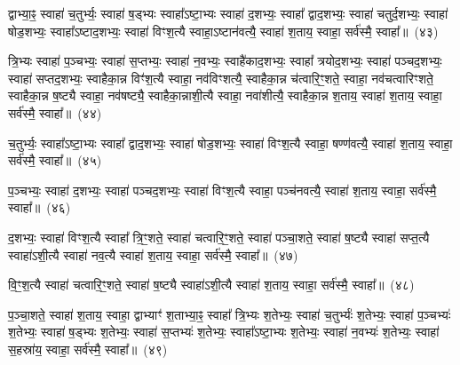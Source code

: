 {\anuvakamend[{एक॑स्मै त्रि॒भ्यः प॑ञ्चा॒शत्}]}%

द्वाभ्या॒ꣴ॒ स्वाहा॑ च॒तुर्भ्यः॒ स्वाहा॑ ष॒ड्भ्यः स्वाहा᳚\-ऽष्टा॒भ्यः स्वाहा॑ द॒शभ्यः॒ स्वाहा᳚ द्वाद॒शभ्यः॒ स्वाहा॑ चतुर्द॒शभ्यः॒ स्वाहा॑ षोड॒शभ्यः॒ स्वाहा᳚\-ऽष्टाद॒शभ्यः॒ स्वाहा॑ विꣳश॒त्यै स्वाहा॒\-ऽष्टान॑वत्यै॒ स्वाहा॑ श॒ताय॒ स्वाहा॒ सर्व॑स्मै॒ स्वाहा᳚॥~(४३)

{\anuvakamend[{द्वाभ्या॑म॒ष्टान॑वत्यै॒ षड्विꣳ॑शतिः}]}%

त्रि॒भ्यः स्वाहा॑ प॒ञ्चभ्यः॒ स्वाहा॑ स॒प्तभ्यः॒ स्वाहा॑ न॒वभ्यः॒ स्वाहै॑काद॒शभ्यः॒ स्वाहा᳚ त्रयोद॒शभ्यः॒ स्वाहा॑ पञ्चद॒शभ्यः॒ स्वाहा॑ सप्तद॒शभ्यः॒ स्वाहैका॒न्न विꣳ॑श॒त्यै स्वाहा॒ नव॑विꣳशत्यै॒ स्वाहैका॒न्न च॑त्वारि॒ꣳ॒शते॒ स्वाहा॒ नव॑चत्वारिꣳशते॒ स्वाहैका॒न्न ष॒ष्ट्यै स्वाहा॒ नव॑षष्ट्यै॒ स्वाहैका॒न्नाशी॒त्यै स्वाहा॒ नवा॑शीत्यै॒ स्वाहैका॒न्न श॒ताय॒ स्वाहा॑ श॒ताय॒ स्वाहा॒ सर्व॑स्मै॒ स्वाहा᳚॥~(४४)

{\anuvakamend[{त्रि॒भ्यो᳚\-ऽष्टाचत्वारि॒ꣳ॒शत्}]}%

च॒तुर्भ्यः॒ स्वाहा᳚\-ऽष्टा॒भ्यः स्वाहा᳚ द्वाद॒शभ्यः॒ स्वाहा॑ षोड॒शभ्यः॒ स्वाहा॑ विꣳश॒त्यै स्वाहा॒ षण्ण॑वत्यै॒ स्वाहा॑ श॒ताय॒ स्वाहा॒ सर्व॑स्मै॒ स्वाहा᳚॥~(४५)

{\anuvakamend[{च॒तुर्भ्यः॒ षण्ण॑वत्यै॒ षोड॑श}]}%

प॒ञ्चभ्यः॒ स्वाहा॑ द॒शभ्यः॒ स्वाहा॑ पञ्चद॒शभ्यः॒ स्वाहा॑ विꣳश॒त्यै स्वाहा॒ पञ्च॑नवत्यै॒ स्वाहा॑ श॒ताय॒ स्वाहा॒ सर्व॑स्मै॒ स्वाहा᳚॥~(४६)

{\anuvakamend[{प॒ञ्चभ्यः॒ प़ञ्च॑नवत्यै॒ चतु॑र्दश}]}%

द॒शभ्यः॒ स्वाहा॑ विꣳश॒त्यै स्वाहा᳚ त्रि॒ꣳ॒शते॒ स्वाहा॑ चत्वारि॒ꣳ॒शते॒ स्वाहा॑ पञ्चा॒शते॒ स्वाहा॑ ष॒ष्ट्यै स्वाहा॑ सप्त॒त्यै स्वाहा॑\-ऽशी॒त्यै स्वाहा॑ नव॒त्यै स्वाहा॑ श॒ताय॒ स्वाहा॒ सर्व॑स्मै॒ स्वाहा᳚॥~(४७)

{\anuvakamend[{द॒शभ्यो॒ द्वाविꣳ॑शतिः}]}%

वि॒ꣳ॒श॒त्यै स्वाहा॑ चत्वारि॒ꣳ॒शते॒ स्वाहा॑ ष॒ष्ट्यै स्वाहा॑\-ऽशी॒त्यै स्वाहा॑ श॒ताय॒ स्वाहा॒ सर्व॑स्मै॒ स्वाहा᳚॥~(४८)

{\anuvakamend[{वि॒ꣳ॒श॒त्यै द्वाद॑श}]}%

प॒ञ्चा॒शते॒ स्वाहा॑ श॒ताय॒ स्वाहा॒ द्वाभ्याꣳ॑ श॒ताभ्या॒ꣴ॒ स्वाहा᳚ त्रि॒भ्यः श॒तेभ्यः॒ स्वाहा॑ च॒तुर्भ्यः॑ श॒तेभ्यः॒ स्वाहा॑ प॒ञ्चभ्यः॑ श॒तेभ्यः॒ स्वाहा॑ ष॒ड्भ्यः श॒तेभ्यः॒ स्वाहा॑ स॒प्तभ्यः॑ श॒तेभ्यः॒ स्वाहा᳚\-ऽष्टा॒भ्यः श॒तेभ्यः॒ स्वाहा॑ न॒वभ्यः॑ श॒तेभ्यः॒ स्वाहा॑ स॒हस्रा॑य॒ स्वाहा॒ सर्व॑स्मै॒ स्वाहा᳚॥~(४९)

{\anuvakamend[{प॒ञ्चा॒शते॒ द्वात्रिꣳ॑शत्}]}%

